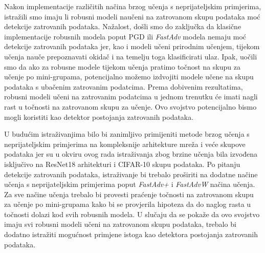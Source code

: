 \documentclass[times, utf8, zavrsni, numeric]{fer}
\begin{document}
Nakon implementacije različitih načina brzog učenja s neprijateljskim primjerima, istražili smo imaju li robusni modeli naučeni na zatrovanom skupu podataka moć detekcije zatrovanih podataka.
Nažalost, došli smo do zaključka da klasične implementacije robusnih modela poput PGD ili \textit{FastAdv} modela nemaju moć detekcije zatrovanih podataka jer, kao i modeli učeni prirodnim učenjem, 
tijekom učenja nauče prepoznavati okidač i na temelju toga klasificirati ulaz. 
Ipak, uočili smo da ako za robusne modele tijekom učenja pratimo točnost na skupu za učenje po mini-grupama, potencijalno možemo izdvojiti modele učene na skupu podataka s ubačenim zatrovanim podatcima.
Prema dobivenim rezultatima, robusni modeli učeni na zatrovanim podatcima u jednom trenutku će imati nagli rast u točnosti na zatrovanom skupu za učenje. Ovo svojstvo potencijalno bismo mogli koristiti kao detektor postojanja zatrovanih podataka.

\pagebreak

U budućim istraživanjima bilo bi zanimljivo primijeniti metode brzog učenja s neprijateljskim primjerima na kompleksnije arhitekture mreža i veće skupove podataka 
jer su u okviru ovog rada istraživanja zbog brzine učenja bila izvođena isključivo na ResNet18 arhitekturi i CIFAR-10 skupu podataka. 
Po pitanju detekcije zatrovanih podataka, istraživanje bi trebalo proširiti na dodatne načine učenja s neprijateljskim primjerima poput \textit{FastAdv+} i \textit{FastAdvW} načina učenja.
Za sve načine učenja trebalo bi provesti praćenje točnosti na zatrovanom skupu za učenje po mini-grupama kako bi se provjerila hipoteza da do naglog rasta u točnosti dolazi kod svih robusnih modela.
U slučaju da se pokaže da ovo svojstvo imaju svi robusni modeli učeni na zatrovanom skupu podataka, trebalo bi dodatno istražiti mogućnost primjene istoga kao detektora postojanja zatrovanih podataka.



\end{document}
